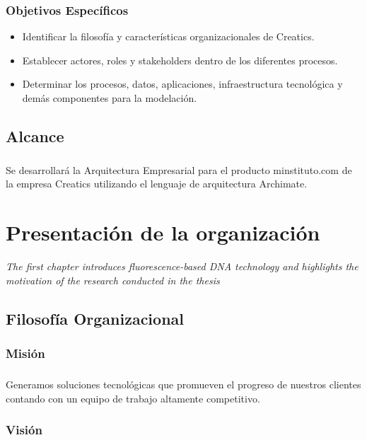   \subsection{Objetivos Específicos}
    \begin{itemize}
      \item Identificar la filosofía y características organizacionales de Creatics.
      \item Establecer actores, roles y stakeholders dentro de los diferentes procesos.
      \item Determinar los procesos, datos, aplicaciones, infraestructura tecnológica y demás componentes para la modelación.
    \end{itemize}

\section{Alcance}
  \paragraph*{}
  Se desarrollará la Arquitectura Empresarial para el producto minstituto.com de la empresa Creatics utilizando el lenguaje de arquitectura Archimate.

\chapter{Presentación de la organización}
\label{chap:Descripcion}
\textit{The first chapter introduces fluorescence-based DNA technology and highlights the motivation of the research conducted in the thesis}
\vfill
\minitoc
\newpage

\section{Filosofía Organizacional}
  
  \subsection{Misión}
    \paragraph*{}
    Generamos soluciones tecnológicas que promueven el progreso de nuestros clientes contando con un equipo de trabajo altamente competitivo.
  
  \subsection{Visión}
